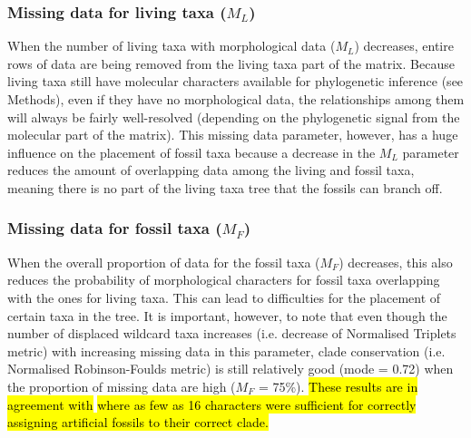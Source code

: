 \documentclass[12pt,letterpaper]{article}
\begin{document}
\subsubsection{Missing data for living taxa ($M_{L}$)}
When the number of living taxa with morphological data ($M_{L}$) decreases, entire rows of data are being removed from the living taxa part of the matrix.
Because living taxa still have molecular characters available for phylogenetic inference (see Methods), even if they have no morphological data, the relationships among them will always be fairly well-resolved (depending on the phylogenetic signal from the molecular part of the matrix).
This missing data parameter, however, has a huge influence on the placement of fossil taxa because a decrease in the $M_{L}$ parameter reduces the amount of overlapping data among the living and fossil taxa, meaning there is no part of the living taxa tree that the fossils can branch off.

\subsubsection{Missing data for fossil taxa ($M_{F}$)}
When the overall proportion of data for the fossil taxa ($M_{F}$) decreases, this also reduces the probability of morphological characters for fossil taxa overlapping with the ones for living taxa.
This can lead to difficulties for the placement of certain taxa in the tree.
It is important, however, to note that even though the number of displaced wildcard taxa increases (i.e. decrease of Normalised Triplets metric) with increasing missing data in this parameter, clade conservation (i.e. Normalised Robinson-Foulds metric) is still relatively good (mode = 0.72) when the proportion of missing data are high ($M_{F}$ = 75\%).
\hl{These results are in agreement with }\cite{manosphylogeny2007}\hl{ where as few as 16 characters were sufficient for correctly assigning artificial fossils to their correct clade.}
\end{document}
